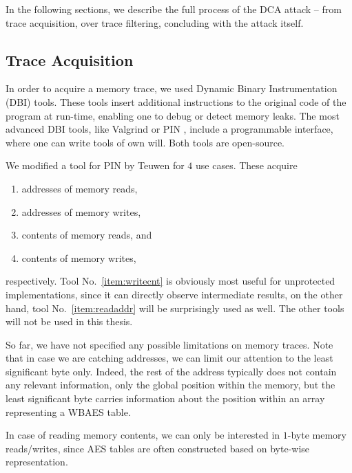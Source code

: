 In the following sections, we describe the full process of the DCA attack -- from trace acquisition, over trace filtering, concluding with the attack itself.



\subsection{Trace Acquisition}
\label{sec:tracq}

In order to acquire a memory trace, we used Dynamic Binary Instrumentation (DBI) tools. These tools insert additional instructions to the original code of the program at run-time, enabling one to debug or detect memory leaks. The most advanced DBI tools, like Valgrind \cite{nethercote2007valgrind} or PIN \cite{luk2005pin}, include a programmable interface, where one can write tools of own will. Both tools are open-source.

We modified a tool for PIN by Teuwen \cite{teuwen2015movfuscator} for $4$ use cases. These acquire
\begin{enumerate}
	\item addresses of memory reads, \label{item:readaddr}
	\item addresses of memory writes,
	\item contents of memory reads, and
	\item contents of memory writes, \label{item:writecnt}
\end{enumerate}
respectively. Tool No.~\ref{item:writecnt} is obviously most useful for unprotected implementations, since it can directly observe intermediate results, on the other hand, tool No.~\ref{item:readaddr} will be surprisingly used as well. The other tools will not be used in this thesis.

\begin{note}
\label{note:lsb}
	So far, we have not specified any possible limitations on memory traces. Note that in case we are catching addresses, we can limit our attention to the least significant byte only. Indeed, the rest of the address typically does not contain any relevant information, only the global position within the memory, but the least significant byte carries information about the position within an array representing a WBAES table.
	
	In case of reading memory contents, we can only be interested in $1$-byte memory reads/writes, since AES tables are often constructed based on byte-wise representation.
\end{note}


